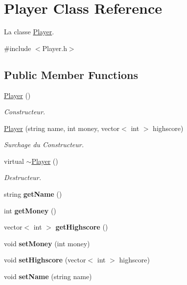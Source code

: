 \hypertarget{classPlayer}{\section{Player Class Reference}
\label{classPlayer}
}


La classe \hyperlink{classPlayer}{Player}.  




{\ttfamily \#include $<$Player.\-h$>$}

\subsection*{Public Member Functions}
\begin{DoxyCompactItemize}
\item 
\hyperlink{classPlayer_affe0cc3cb714f6deb4e62f0c0d3f1fd8}{Player} ()
\begin{DoxyCompactList}\small\item\em Constructeur. \end{DoxyCompactList}\item 
\hyperlink{classPlayer_a0e93e5237600a8160ee5632f41068252}{Player} (string name, int money, vector$<$ int $>$ highscore)
\begin{DoxyCompactList}\small\item\em Surchage du Constructeur. \end{DoxyCompactList}\item 
virtual \hyperlink{classPlayer_a8981c201ffb2270c0b6dbd467b627376}{$\sim$\-Player} ()
\begin{DoxyCompactList}\small\item\em Destructeur. \end{DoxyCompactList}\item 
\hypertarget{classPlayer_af9a6045fa96f736664c4eab4caa5e8e5}{string {\bfseries get\-Name} ()}\label{classPlayer_af9a6045fa96f736664c4eab4caa5e8e5}

\item 
\hypertarget{classPlayer_ac45154df7c4eb2d1d58255c3ff1c55dd}{int {\bfseries get\-Money} ()}\label{classPlayer_ac45154df7c4eb2d1d58255c3ff1c55dd}

\item 
\hypertarget{classPlayer_a25096c68b44eae33a189bdf65383afff}{vector$<$ int $>$ {\bfseries get\-Highscore} ()}\label{classPlayer_a25096c68b44eae33a189bdf65383afff}

\item 
\hypertarget{classPlayer_a6e78f6a0e2e73323bf200a9e1c2e0ac6}{void {\bfseries set\-Money} (int money)}\label{classPlayer_a6e78f6a0e2e73323bf200a9e1c2e0ac6}

\item 
\hypertarget{classPlayer_af1a4192c97234896cc60cecd817ff2b0}{void {\bfseries set\-Highscore} (vector$<$ int $>$ highscore)}\label{classPlayer_af1a4192c97234896cc60cecd817ff2b0}

\item 
\hypertarget{classPlayer_aa9728db5b22d438505b4694c5ea03f75}{void {\bfseries set\-Name} (string name)}\label{classPlayer_aa9728db5b22d438505b4694c5ea03f75}

\end{DoxyCompactItemize}



